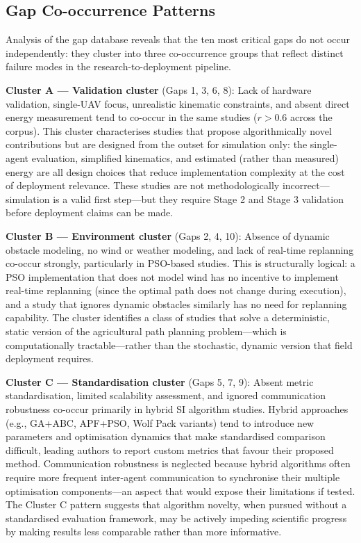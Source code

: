 \documentclass[review,3p,times]{elsarticle}
\begin{document}
\subsection{Gap Co-occurrence Patterns}

Analysis of the gap database reveals that the ten most critical gaps do not occur independently: they cluster into three co-occurrence groups that reflect distinct failure modes in the research-to-deployment pipeline.

\textbf{Cluster A --- Validation cluster} (Gaps 1, 3, 6, 8): Lack of hardware validation, single-UAV focus, unrealistic kinematic constraints, and absent direct energy measurement tend to co-occur in the same studies ($r > 0.6$ across the corpus). This cluster characterises studies that propose algorithmically novel contributions but are designed from the outset for simulation only: the single-agent evaluation, simplified kinematics, and estimated (rather than measured) energy are all design choices that reduce implementation complexity at the cost of deployment relevance. These studies are not methodologically incorrect---simulation is a valid first step---but they require Stage 2 and Stage 3 validation before deployment claims can be made.

\textbf{Cluster B --- Environment cluster} (Gaps 2, 4, 10): Absence of dynamic obstacle modeling, no wind or weather modeling, and lack of real-time replanning co-occur strongly, particularly in PSO-based studies. This is structurally logical: a PSO implementation that does not model wind has no incentive to implement real-time replanning (since the optimal path does not change during execution), and a study that ignores dynamic obstacles similarly has no need for replanning capability. The cluster identifies a class of studies that solve a deterministic, static version of the agricultural path planning problem---which is computationally tractable---rather than the stochastic, dynamic version that field deployment requires.

\textbf{Cluster C --- Standardisation cluster} (Gaps 5, 7, 9): Absent metric standardisation, limited scalability assessment, and ignored communication robustness co-occur primarily in hybrid SI algorithm studies. Hybrid approaches (e.g., GA+ABC, APF+PSO, Wolf Pack variants) tend to introduce new parameters and optimisation dynamics that make standardised comparison difficult, leading authors to report custom metrics that favour their proposed method. Communication robustness is neglected because hybrid algorithms often require more frequent inter-agent communication to synchronise their multiple optimisation components---an aspect that would expose their limitations if tested. The Cluster C pattern suggests that algorithm novelty, when pursued without a standardised evaluation framework, may be actively impeding scientific progress by making results less comparable rather than more informative.
\end{document}
